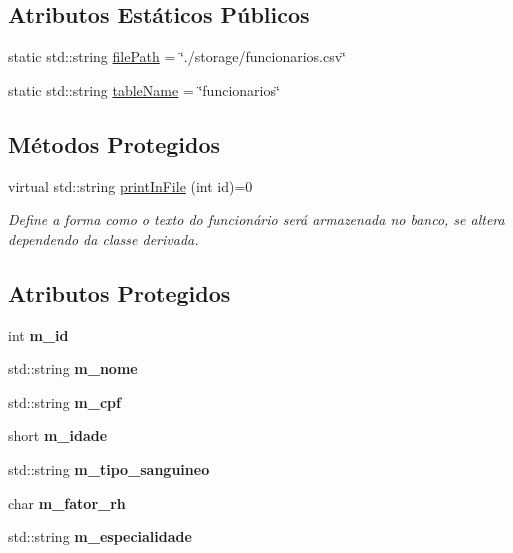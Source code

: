 \subsection*{Atributos Estáticos Públicos}
\begin{DoxyCompactItemize}
\item 
static std\+::string \hyperlink{classFuncionario_a15c3f1c0a9cefad48a036666c2352b60}{file\+Path} = \char`\"{}./storage/funcionarios.\+csv\char`\"{}
\item 
static std\+::string \hyperlink{classFuncionario_a6c10ac916f8b0435bea51c240ca0df34}{table\+Name} = \char`\"{}funcionarios\char`\"{}
\end{DoxyCompactItemize}
\subsection*{Métodos Protegidos}
\begin{DoxyCompactItemize}
\item 
virtual std\+::string \hyperlink{classFuncionario_a696332cf5ccde3a31f84e5af687e7ec2}{print\+In\+File} (int id)=0
\begin{DoxyCompactList}\small\item\em Define a forma como o texto do funcionário será armazenada no banco, se altera dependendo da classe derivada. \end{DoxyCompactList}\end{DoxyCompactItemize}
\subsection*{Atributos Protegidos}
\begin{DoxyCompactItemize}
\item 
\mbox{\label{classFuncionario_a123c4af00e4e6eea5d4d9366a8bfefed}} 
int {\bfseries m\+\_\+id}
\item 
\mbox{\label{classFuncionario_a6d5228656aa32b0f36f02e08c51cd1e4}} 
std\+::string {\bfseries m\+\_\+nome}
\item 
\mbox{\label{classFuncionario_a74bd5f4c71bfb42219f0cce2a72eeb47}} 
std\+::string {\bfseries m\+\_\+cpf}
\item 
\mbox{\label{classFuncionario_a2bc5a68aebcf1a792812430ce5c8bdca}} 
short {\bfseries m\+\_\+idade}
\item 
\mbox{\label{classFuncionario_aa09cfc8a989b1a292cd21380a5fcb8bc}} 
std\+::string {\bfseries m\+\_\+tipo\+\_\+sanguineo}
\item 
\mbox{\label{classFuncionario_ab8b1fa2c4d830ea6a03c5d1db8ee1002}} 
char {\bfseries m\+\_\+fator\+\_\+rh}
\item 
\mbox{\label{classFuncionario_ac9ccf61efca75f4130e79ef06b7278a2}} 
std\+::string {\bfseries m\+\_\+especialidade}
\end{DoxyCompactItemize}
